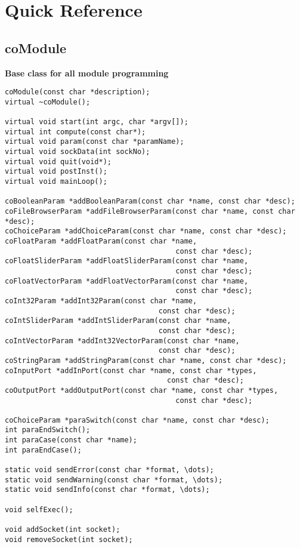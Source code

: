 
\begin{htmlonly}

\end{htmlonly}






\startdocument
\chapter{Quick Reference}
\label{QuickReference}


\section{coModule}

{\bf Base class for all module programming}

\begin{verbatim}
coModule(const char *description);
virtual ~coModule();
 
virtual void start(int argc, char *argv[]);
virtual int compute(const char*);
virtual void param(const char *paramName);
virtual void sockData(int sockNo);
virtual void quit(void*);
virtual void postInst();
virtual void mainLoop();

coBooleanParam *addBooleanParam(const char *name, const char *desc);
coFileBrowserParam *addFileBrowserParam(const char *name, const char *desc);
coChoiceParam *addChoiceParam(const char *name, const char *desc);
coFloatParam *addFloatParam(const char *name, 
                                        const char *desc);
coFloatSliderParam *addFloatSliderParam(const char *name, 
                                        const char *desc);
coFloatVectorParam *addFloatVectorParam(const char *name, 
                                        const char *desc);
coInt32Param *addInt32Param(const char *name, 
                                    const char *desc);
coIntSliderParam *addIntSliderParam(const char *name, 
                                    const char *desc);
coIntVectorParam *addInt32VectorParam(const char *name, 
                                    const char *desc);
coStringParam *addStringParam(const char *name, const char *desc);
coInputPort *addInPort(const char *name, const char *types, 
                                      const char *desc);
coOutputPort *addOutputPort(const char *name, const char *types, 
                                        const char *desc);

coChoiceParam *paraSwitch(const char *name, const char *desc);
int paraEndSwitch();
int paraCase(const char *name);
int paraEndCase();

static void sendError(const char *format, \dots);
static void sendWarning(const char *format, \dots);
static void sendInfo(const char *format, \dots);

void selfExec();

void addSocket(int socket); 
void removeSocket(int socket); 
\end{verbatim}
 

